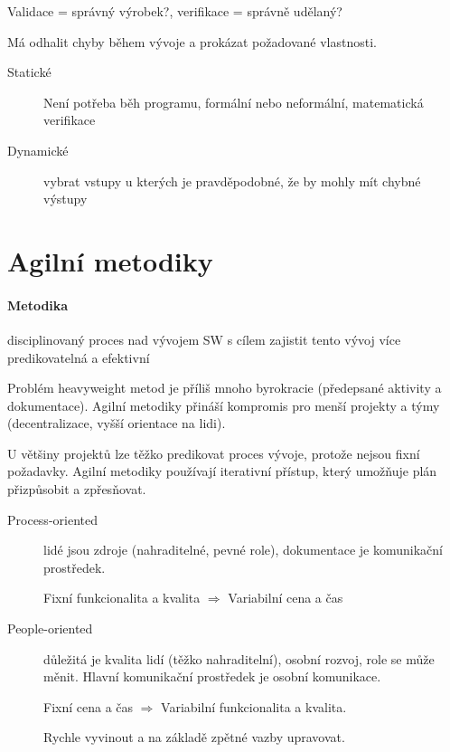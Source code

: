 \documentclass[a4paper, 11pt]{report}
\begin{document}
Validace = správný výrobek?, verifikace = správně udělaný?

Má odhalit chyby během vývoje a prokázat požadované vlastnosti.

\begin{description}
	\item[Statické] Není potřeba běh programu, formální nebo neformální, matematická verifikace
	\item[Dynamické] vybrat vstupy u kterých je pravděpodobné, že by mohly mít chybné výstupy
\end{description}

\section{Agilní metodiky}

\paragraph{Metodika} disciplinovaný proces nad vývojem SW s cílem zajistit tento vývoj více predikovatelná a efektivní

Problém heavyweight metod je příliš mnoho byrokracie (předepsané aktivity a dokumentace). Agilní metodiky přináší kompromis pro menší projekty a týmy (decentralizace, vyšší orientace na lidi).

U většiny projektů lze těžko predikovat proces vývoje, protože nejsou fixní požadavky. Agilní metodiky používají iterativní přístup, který umožňuje plán přizpůsobit a zpřesňovat.

\begin{description}
	\item[Process-oriented] lidé jsou zdroje (nahraditelné, pevné role), dokumentace je komunikační prostředek.
	
	Fixní funkcionalita a kvalita $\Rightarrow$ Variabilní cena a čas
	\item[People-oriented] důležitá je kvalita lidí (těžko nahraditelní), osobní rozvoj, role se může měnit. Hlavní komunikační prostředek je osobní komunikace.
	
	Fixní cena a čas $\Rightarrow$ Variabilní funkcionalita a kvalita.
	
	Rychle vyvinout a na základě zpětné vazby upravovat.
\end{description}
\end{document}
